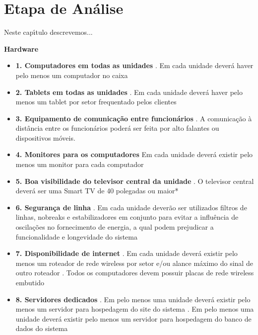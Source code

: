 
\chapter{Etapa de An\'{a}lise}

Neste cap\'{\i}tulo descrevemos...

\textbf{Hardware}
\begin{itemize}[label={}]
	\item \textbf{1. Computadores em todas as unidades}
		. Em cada unidade deverá haver pelo menos um computador no caixa
	\item \textbf{2. Tablets em todas as unidades}
		. Em cada unidade deverá haver pelo menos um tablet por setor frequentado pelos clientes
	\item \textbf{3. Equipamento de comunicação entre funcionários}
		. A comunicação à distância entre os funcionários poderá ser feita por alto falantes ou dispositivos móveis.
	\item \textbf{4. Monitores para os computadores}
		 Em cada unidade deverá existir pelo menos um monitor para cada computador
	\item \textbf{5. Boa visibilidade do televisor central da unidade}
		. O televisor central deverá ser uma Smart TV de 40 polegadas ou maior*
	\item \textbf{6. Segurança de linha}
		. Em cada unidade deverão ser utilizados filtros de linhas, nobreaks e estabilizadores em conjunto para evitar a influência de oscilações no fornecimento de energia, a qual podem prejudicar a funcionalidade e longevidade do sistema
	\item \textbf{7. Disponibilidade de internet}
		. Em cada unidade deverá existir pelo menos um roteador de rede wireless por setor e/ou alance máximo do sinal de outro roteador
		. Todos os computadores devem possuir placas de rede wireless embutido
	\item \textbf{8. Servidores dedicados}
		. Em pelo menos uma unidade deverá existir pelo menos um servidor para hospedagem do site do sistema
		. Em pelo menos uma unidade deverá existir pelo menos um servidor para hospedagem do banco de dados do sistema

\end{itemize}
